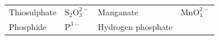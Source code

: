 {{\begin{center}
\begin{xtabular}[t]{|l|l|l|l|}
    
        Thiosulphate &
    
    
        \begin{math}{\mathrm{S}}_{2}\mathrm{O}_{3}^{2-}\end{math} &
    
    
        Manganate &
    
    
        \begin{math}\mathrm{MnO}_{4}^{2-}\end{math}%
     \tabularnewline{}
    
    
        Phosphide &
    
    
        \begin{math}{\mathrm{P}}^{3-}\end{math} &
    
    
        Hydrogen phosphate &
    
    

\end{xtabular}
\end{center}}}
